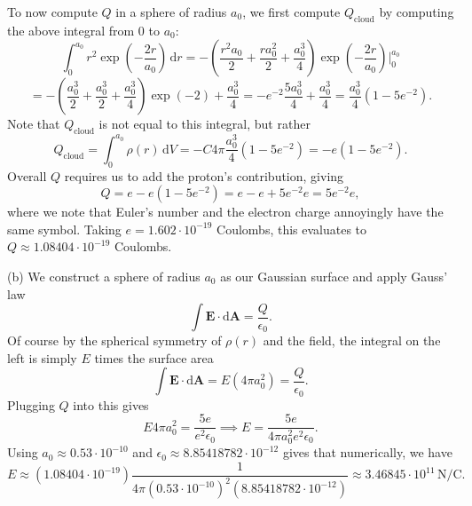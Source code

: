 \documentclass[11pt, letterpaper]{article}
\begin{document}
To now compute $Q$ in a sphere of radius $a_0$, we first compute $Q_{\mathrm{cloud} } $ by computing the above integral from $0$ to $a_0$:
\[
	\int_{0}^{a_0} r^2 \exp \left( -\frac{2r}{a_0}  \right)  \,\mathrm{d} r=-\left( \frac{r^2a_0}{2} +\frac{ra^2_0}{2} +\frac{a_0^3}{4}  \right) \exp \left( -\frac{2r}{a_0}  \right) \bigg|_0^{a_0} 
\]
\[
	=-\left( \frac{a_0^3}{2} +\frac{a_0^3}{2} +\frac{a_0^3}{4}  \right) \exp \left( -2 \right) +\frac{a_0^3}{4} =-e^{-2} \frac{5a_0^3}{4} +\frac{a_0^3}{4} =\frac{a_0^3}{4} \left( 1-5e^{-2}  \right) 
.\]
Note that $Q_{\mathrm{cloud} } $ is not equal to this integral, but rather
\[
	Q_{\mathrm{cloud} } =\int_{0}^{a_0} \rho (r) \,\mathrm{d} V=-C4\pi \frac{a_0^3}{4} \left( 1-5e^{-2}  \right) =-e\left( 1-5e^{-2}  \right) 
.\]
Overall $Q$ requires us to add the proton's contribution, giving
\[
	Q=e-e\left( 1-5e^{-2}  \right) =e-e+5e^{-2}e =5e^{-2}e, 
\]
where we note that Euler's number and the electron charge annoyingly have the same symbol. Taking $e=1.602\cdot 10^{-19} $ Coulombs, this evaluates to $Q\approx 1.08404\cdot 10^{-19} $ Coulombs.

(b) We construct a sphere of radius $a_0$ as our Gaussian surface and apply Gauss' law
\[
	\int \mathbf{E} \cdot  \mathrm{d} \mathbf{A} =\frac{Q}{\epsilon _0} 
.\]
Of course by the spherical symmetry of $\rho (r)$ and the field, the integral on the left is simply $E$ times the surface area
\[
	\int \mathbf{E} \cdot  \mathrm{d} \mathbf{A} =E(4\pi a_0^2)=\frac{Q}{\epsilon _0} 
.\]
Plugging $Q$ into this gives
\[
	E4\pi a_0^2=\frac{5e}{e^2\epsilon _0} \implies E=\frac{5e}{4\pi a_0^2e^2\epsilon _0} 
.\]
Using $a_0\approx 0.53\cdot 10^{-10} $ and $\epsilon _0\approx 8.85418782\cdot 10^{-12} $ gives that numerically, we have
\[
	E\approx \left( 1.08404\cdot 10^{-19}  \right) \frac{1}{4\pi (0.53\cdot 10^{-10} )^2\left( 8.85418782\cdot 10^{-12}  \right) } \approx 3.46845\cdot 10^{11}\, \mathrm{N} /\mathrm{C} 
.\]
\end{document}
